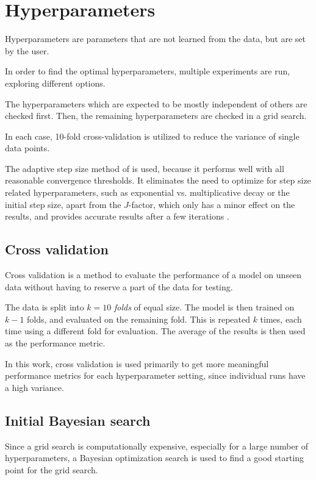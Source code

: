 \section{Hyperparameters}
Hyperparameters are parameters that are not learned from the data,
but are set by the user.

In order to find the optimal hyperparameters,
multiple experiments are run,
exploring different options.

The hyperparameters which are expected to be mostly independent of others are checked first.
Then, the remaining hyperparameters are checked in a grid search. %

In each case, 10-fold cross-validation is utilized to reduce the variance of single data points.

The adaptive step size method of \dseaplus is used,
because it performs well with all reasonable convergence thresholds.
It eliminates the need to optimize for step size related hyperparameters,
  such as
    exponential vs. multiplicative decay
    or the initial step size,
  apart from the $J$-factor,
    which only has a minor effect on the results,
and provides accurate results after a few iterations \cite{dsea_mirko}.


\subsection{Cross validation}
Cross validation is a method to evaluate the performance of a model on unseen data
without having to reserve a part of the data for testing.

The data is split into $k = 10$ \emph{folds} of equal size.
The model is then trained on $k-1$ folds,
and evaluated on the remaining fold.
This is repeated $k$ times,
each time using a different fold for evaluation.
The average of the results is then used as the performance metric.

In this work,
cross validation is used primarily to get more meaningful performance metrics
for each hyperparameter setting,
since individual runs have a high variance.

\subsection{Initial Bayesian search}
Since a grid search is computationally expensive,
  especially for a large number of hyperparameters,
a Bayesian optimization search is used to find a good starting point for the grid search.

